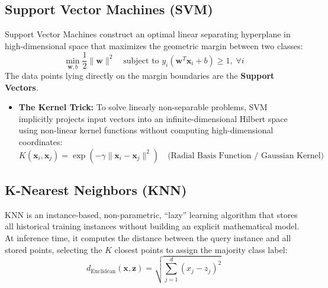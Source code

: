 \subsection{Support Vector Machines (SVM)}
Support Vector Machines construct an optimal linear separating hyperplane in high-dimensional space that maximizes the geometric margin between two classes:
\begin{equation}
\label{eq:svm_objective}
\min_{\mathbf{w}, b} \frac{1}{2} \|\mathbf{w}\|^2 \quad \text{subject to } y_i (\mathbf{w}^T \mathbf{x}_i + b) \ge 1, \; \forall i
\end{equation}
The data points lying directly on the margin boundaries are the \textbf{Support Vectors}.
\begin{itemize}
    \item \textbf{The Kernel Trick:} To solve linearly non-separable problems, SVM implicitly projects input vectors into an infinite-dimensional Hilbert space using non-linear kernel functions without computing high-dimensional coordinates:
    \begin{equation}
    K(\mathbf{x}_i, \mathbf{x}_j) = \exp\left(-\gamma \|\mathbf{x}_i - \mathbf{x}_j\|^2\right) \quad \text{(Radial Basis Function / Gaussian Kernel)}
    \end{equation}
\end{itemize}

\subsection{K-Nearest Neighbors (KNN)}
KNN is an instance-based, non-parametric, ``lazy'' learning algorithm that stores all historical training instances without building an explicit mathematical model. At inference time, it computes the distance between the query instance and all stored points, selecting the $K$ closest points to assign the majority class label:
\begin{equation}
d_{\text{Euclidean}}(\mathbf{x}, \mathbf{z}) = \sqrt{\sum_{j=1}^d (x_j - z_j)^2}
\end{equation}


